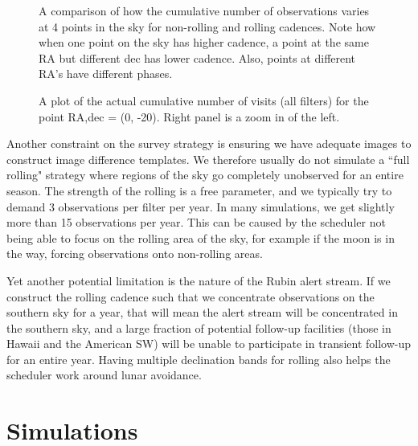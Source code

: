 \documentclass[modern]{aastex62}
\begin{document}
\begin{figure}
\caption{A comparison of how the cumulative number of observations varies at 4 points in the sky for non-rolling and rolling cadences. Note how when one point on the sky has higher cadence, a point at the same RA but different dec has lower cadence. Also, points at different RA's have different phases. \label{fig:ideal_foot}}
\end{figure}

\begin{figure}
\caption{A plot of the actual cumulative number of visits (all filters) for the point RA,dec = (0, -20). Right panel is a zoom in of the left. \label{fig:actual_foot}}
\end{figure}




Another constraint on the survey strategy is ensuring we have adequate images to construct image difference templates. We therefore usually do not simulate a ``full rolling" strategy where regions of the sky go completely unobserved for an entire season. The strength of the rolling is a free parameter, and we typically try to demand 3 observations per filter per year. In many simulations, we get slightly more than 15 observations per year. This can be caused by the scheduler not being able to focus on the rolling area of the sky, for example if the moon is in the way, forcing observations onto non-rolling areas.

Yet another potential limitation is the nature of the Rubin alert stream. If we construct the rolling cadence such that we concentrate observations on the southern sky for a year, that will mean the alert stream will be concentrated in the southern sky, and a large fraction of potential follow-up facilities (those in Hawaii and the American SW) will be unable to participate in transient follow-up for an entire year. Having multiple declination bands for rolling also helps the scheduler work around lunar avoidance.





\section{Simulations}
\end{document}
